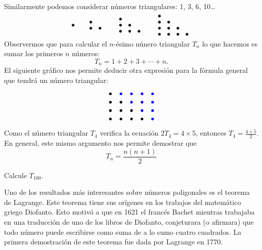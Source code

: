 Similarmente podemos considerar números triangulares: 1, 3, 6, 10\dots
\begin{align*}
	\bullet
	&&
	\begin{array}{cc}
		\bullet\\
		\bullet & \bullet 
	\end{array}
	&&
	\begin{array}{ccc}
		\bullet\\
		\bullet & \bullet \\
		\bullet & \bullet & \bullet
	\end{array}
	&&
	\begin{array}{cccc}
		\bullet\\
		\bullet & \bullet \\
		\bullet & \bullet & \bullet\\
		\bullet & \bullet & \bullet & \bullet
	\end{array}
\end{align*}
Observermos que para calcular el $n$-ésimo núnero triangular $T_n$ lo que
hacemos es sumar los primeros $n$ números: 
\[
	T_n=1+2+3+\cdots+n.
\]
El siguiente gráfico nos permite deducir otra expresión para la fórmula general
que tendrá un número triangular:
\[
	\begin{array}{ccccc}
		\bullet & \textcolor{blue}{\bullet} & \textcolor{blue}{\bullet} & \textcolor{blue}{\bullet} & \textcolor{blue}{\bullet}\\
		\bullet & \bullet & \textcolor{blue}{\bullet} & \textcolor{blue}{\bullet} & \textcolor{blue}{\bullet}\\
		\bullet & \bullet & \bullet & \textcolor{blue}{\bullet} & \textcolor{blue}{\bullet} \\
		\bullet & \bullet & \bullet & \bullet & \textcolor{blue}{\bullet}
	\end{array}
\]
Como el número triangular $T_4$ verifica la ecuación $2T_4=4\times 5$, entonces
$T_4=\frac{4\times 5}{2}$. En general, este mismo argumento nos permite
demostrar que
\[
	T_n=\frac{n(n+1)}{2}
\]

\begin{exercise}
	Calcule $T_{100}$. 
\end{exercise}

Uno de los resultados más interesantes sobre números poligonales es el teorema
de Lagrange. Este teorema tiene sus orígenes en los trabajos del matemático
griego Diofanto. Esto motivó a que en 1621 el francés Bachet mientras trabajaba
en una traducción de uno de los libros de Diofanto, conjeturara (o afirmara)
que todo número puede escribirse como suma de a lo sumo cuatro cuadrados. La
primera demostración de este teorema fue dada por Lagrange en 1770.

